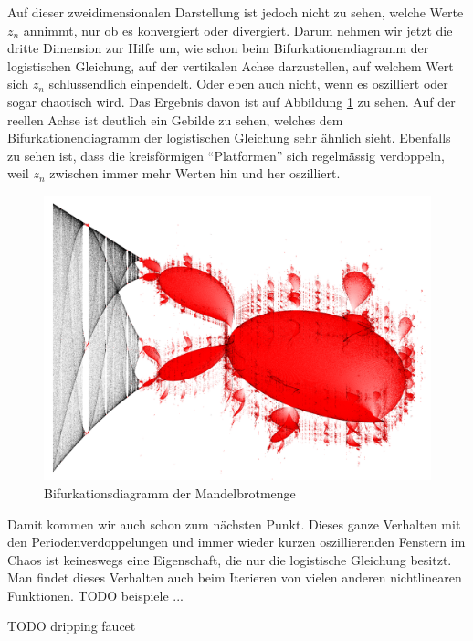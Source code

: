 Auf dieser zweidimensionalen Darstellung 
ist jedoch nicht zu sehen, welche
Werte $z_n$ annimmt, nur ob es konvergiert oder divergiert.
Darum nehmen wir jetzt die dritte Dimension zur Hilfe um,
wie schon beim Bifurkationendiagramm der logistischen Gleichung,
auf der vertikalen Achse darzustellen, 
auf welchem Wert sich $z_n$ schlussendlich einpendelt.
Oder eben auch nicht, wenn es oszilliert oder sogar
chaotisch wird. 
Das Ergebnis davon ist auf Abbildung 
\ref{fig:mandel_3d}
zu sehen. 
Auf der reellen Achse ist deutlich ein Gebilde zu sehen,
welches dem Bifurkationendiagramm der logistischen
Gleichung sehr ähnlich sieht. 
Ebenfalls zu sehen ist, dass die kreisförmigen
``Platformen'' sich regelmässig verdoppeln, weil
$z_n$ zwischen immer mehr Werten hin und her oszilliert. 
\begin{figure}
    \includegraphics[width=\linewidth]{papers/logistic/figures/mandel_3d.png}
    \caption{Bifurkationsdiagramm der Mandelbrotmenge}
    \label{fig:mandel_3d}
\end{figure}

Damit kommen wir auch schon zum nächsten Punkt. 
Dieses ganze Verhalten mit den Periodenverdoppelungen und
immer wieder kurzen oszillierenden Fenstern im Chaos
ist keineswegs eine Eigenschaft, 
die nur die logistische Gleichung besitzt.
Man findet dieses Verhalten auch beim Iterieren 
von vielen anderen nichtlinearen Funktionen. 
TODO beispiele ...

TODO dripping faucet